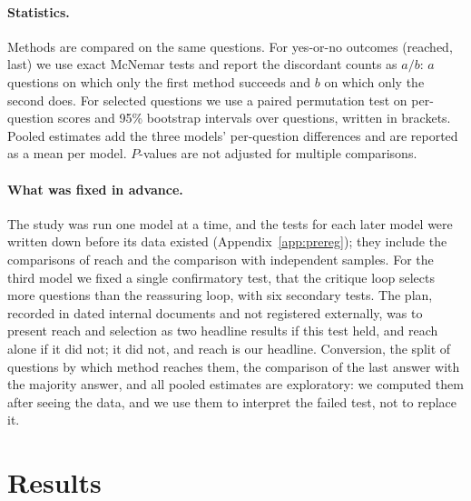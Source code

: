 \documentclass[11pt]{article}
\begin{document}
\paragraph{Statistics.}
Methods are compared on the same questions.
For yes-or-no outcomes (reached, last) we use exact McNemar tests and report the discordant counts as $a/b$: $a$ questions on which only the first method succeeds and $b$ on which only the second does.
For selected questions we use a paired permutation test on per-question scores and 95\% bootstrap intervals over questions, written in brackets.
Pooled estimates add the three models' per-question differences and are reported as a mean per model.
$P$-values are not adjusted for multiple comparisons.

\paragraph{What was fixed in advance.}
The study was run one model at a time, and the tests for each later model were written down before its data existed (Appendix~\ref{app:prereg}); they include the comparisons of reach and the comparison with independent samples.
For the third model we fixed a single confirmatory test, that the critique loop selects more questions than the reassuring loop, with six secondary tests.
The plan, recorded in dated internal documents and not registered externally, was to present reach and selection as two headline results if this test held, and reach alone if it did not; it did not, and reach is our headline.
Conversion, the split of questions by which method reaches them, the comparison of the last answer with the majority answer, and all pooled estimates are exploratory: we computed them after seeing the data, and we use them to interpret the failed test, not to replace it.

\section{Results}
\end{document}
